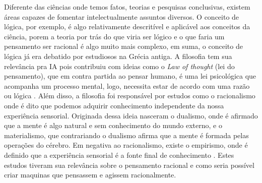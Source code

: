 Diferente das ciências onde temos fatos, teorias e pesquisas conclusivas, existem áreas capazes de fomentar intelectualmente assuntos diversos. O conceito de lógica, por exemplo, é algo relativamente descritível e aplicável aos conceitos da ciência, porem a teoria por trás do que viria ser lógico e o que faria um pensamento ser racional é algo muito mais complexo, em suma, o conceito de lógica já era debatido por estudiosos na Grécia antiga. A filosofia tem sua relevância pra IA pois contribuiu com ideias como o \textit{Law of thought} (lei do pensamento), que em contra partida ao pensar humano, é uma lei psicológica que acompanha um processo mental, logo, necessita estar de acordo com uma razão ou lógica \cite[4-5]{frege1956thought russell2003artificial }. Além disso, a filosofia foi responsável por estudos como o racionalismo onde é dito que podemos adquirir conhecimento independente da nossa experiência sensorial. Originada dessa ideia nasceram o dualismo, onde é afirmado que a mente é algo natural e sem conhecimento do mundo externo, e o materialismo, que contrariando o dualismo afirma que a mente é formada pelas operações do cérebro. Em negativa ao racionalismo, existe o empirismo, onde é definido que a experiência sensorial é a fonte final de conhecimento \cite[6]{rationalismvsempiricism, descartes2013rene, russell2003artificial}. Estes estudos tiveram sua relevância sobre o pensamento racional e como seria possível criar maquinas que pensassem e agissem racionalmente.
